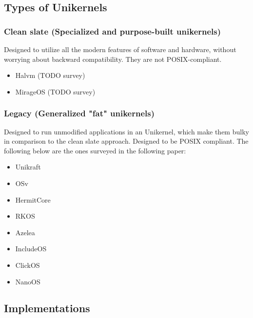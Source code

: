 \subsection{Types of Unikernels}
\subsubsection{Clean slate (Specialized and purpose-built unikernels)}
Designed to utilize all the modern features of software and hardware, without worrying about backward
compatibility. They are not POSIX-compliant. 
\begin{itemize}
  \item Halvm (TODO survey)
  \item MirageOS (TODO survey)
\end{itemize}

\subsubsection{Legacy (Generalized "fat" unikernels)}
Designed to run unmodified applications in an Unikernel, 
which make them bulky in comparison to the clean slate approach. 
Designed to be POSIX compliant. The following below 
are the ones surveyed in the following paper: 
\begin{itemize}
  \item Unikraft
  \item OSv 
  \item HermitCore 
  \item RKOS
  \item Azelea
  \item IncludeOS 
  \item ClickOS
  \item NanoOS
\end{itemize}
%
%
\subsection{Implementations}


